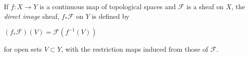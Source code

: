 \documentclass[12pt]{article}
\begin{document}
If $f : X\to Y$ is a continuous map of topological spaces and $\mathcal{F}$ is a sheaf on $X$,  the {\em direct image} sheaf, $f_*\mathcal{F}$ on $Y$ is defined by

$(f_*\mathcal{F})(V) = \mathcal{F}(f^{-1}(V))$

for open sets $V\subset Y$, with the restriction maps induced from those of $\mathcal{F}$.
\end{document}
